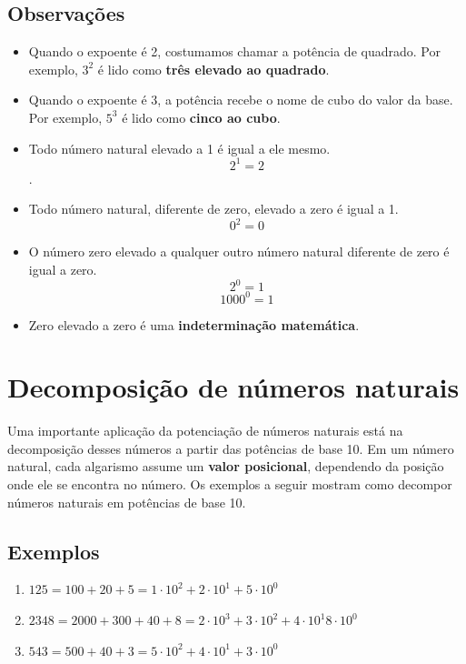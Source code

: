 \documentclass{article}
\begin{document}
\subsection{Observações}
\begin{itemize}
    \item Quando o expoente é 2, costumamos chamar a potência de quadrado. Por exemplo, $3^2$ é lido como \textbf{três elevado ao quadrado}.
   
    \item Quando o expoente é 3, a potência recebe o nome de cubo do valor da base. Por exemplo, $5^3$ é lido como \textbf{cinco ao cubo}. 
    \item Todo número natural elevado a 1 é igual a ele mesmo. 
     $$2^1 = 2$$.
    \item Todo número natural, diferente de zero, elevado a zero é igual a 1. 
    $$0^2 = 0$$
    \item O número zero elevado a qualquer outro número natural diferente de zero é igual a zero. 
    $$2^0 = 1$$
    $$1000^0 = 1$$
    \item Zero elevado a zero é uma \textbf{indeterminação matemática}. 
\end{itemize}
\section{Decomposição de números naturais}
Uma importante aplicação da potenciação de números naturais está na decomposição desses números a partir das potências de base 10. Em um número natural, cada algarismo assume um \textbf{valor posicional}, dependendo da posição onde ele se encontra no número. Os exemplos a seguir mostram como decompor números naturais em potências de base 10. 
\subsection{Exemplos}
\begin{enumerate}
    \item $125 = 100 + 20 + 5  = 1 \cdot 10^2 + 2\cdot 10^1 + 5 \cdot 10^0$
    \item $2348 = 2000 + 300 + 40 + 8  = 2 \cdot 10^3 + 3 \cdot 10^2 + 4 \cdot 10^1 8 \cdot 10^0$ 
    \item $543 =500 + 40 + 3 = 5 \cdot 10^2 + 4 \cdot 10^1 + 3 \cdot 10^0$ 
\end{enumerate}
\end{document}
